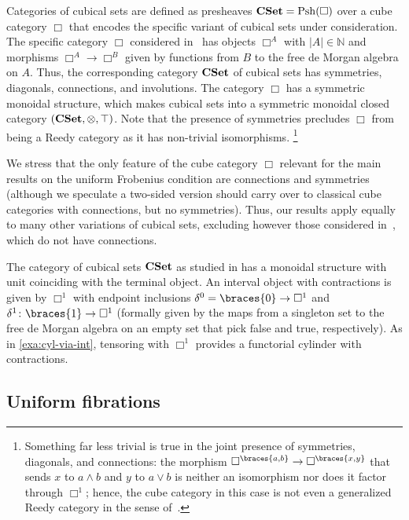 \documentclass[reqno,10pt,a4paper,oneside,draft]{amsart}
\begin{document}
\begin{example} \label{exa:cyl-in-cuset}

Categories of cubical sets are defined as presheaves $\mathbf{CSet} = \mathrm{Psh}(\Box)$ over a cube category $\Box$ that encodes the specific variant of cubical sets under consideration.
The specific category $\Box$ considered in~\cite{cohen-et-al:cubicaltt} has objects $\Box^A$ with $|A| \in \mathbb{N}$ and morphisms $\Box^A \to \Box^B$ given by functions from $B$ to the free de Morgan algebra on $A$.
Thus, the corresponding category $\mathbf{CSet}$ of cubical sets has symmetries, diagonals, connections, and involutions.
The category $\Box$ has a symmetric monoidal structure, which makes cubical sets into a symmetric monoidal closed category $(\mathbf{CSet}, \otimes, \top)$.
Note that the presence of symmetries precludes $\Box$ from being a Reedy category as it has non-trivial isomorphisms.%
\footnote{
Something far less trivial is true in the joint presence of symmetries, diagonals, and connections: the morphism $\Box^{\braces{a, b}} \to \Box^{\braces{x, y}}$ that sends $x$ to $a \wedge b$ and $y$ to $a \vee b$ is neither an isomorphism nor does it factor through $\Box^1$; hence, the cube category in this case is not even a generalized Reedy category in the sense of~\cite{berger-moerdijk:generalized-reedy}.
}

We stress that the only feature of the cube category $\Box$ relevant for the main
results on the uniform Frobenius condition are connections and symmetries (although we speculate a two-sided version should carry over to classical cube categories with connections, but no symmetries).
Thus, our results apply equally to many other variations of cubical sets, excluding however 
those considered in~\cite{coquand-cubical-sets,huber-thesis}, which do not have connections.

The category of cubical sets $\mathbf{CSet}$ as studied in \cite{cohen-et-al:cubicaltt} has a monoidal structure with unit coinciding with the terminal object.
An interval object with contractions is given by $\Box^1$ with endpoint inclusions $\lcyl = \braces{0} \to \Box^1$ and $\rcyl \co \braces{1} \to \Box^1$ (formally given by the maps from a singleton set to the free de Morgan algebra on an empty set that pick false and true, respectively).
As in \cref{exa:cyl-via-int}, tensoring with $\Box^1$ provides a functorial cylinder with contractions.
\end{example}


\subsection*{Uniform fibrations} 
\end{document}

